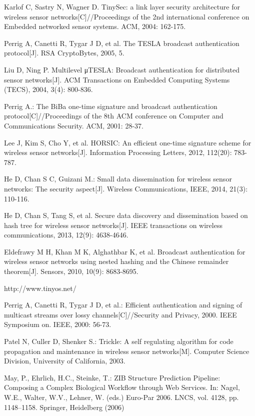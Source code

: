 \documentclass{sig-alternate-05-2015}
\begin{document}
\begin{thebibliography}{13}

 Karlof C, Sastry N, Wagner D. TinySec: a link layer security architecture for wireless sensor networks[C]//Proceedings of the 2nd international conference on Embedded networked sensor systems. ACM, 2004: 162-175.

 Perrig A, Canetti R, Tygar J D, et al. The TESLA broadcast authentication protocol[J]. RSA CryptoBytes, 2005, 5.

Liu D, Ning P. Multilevel μTESLA: Broadcast authentication for distributed sensor networks[J]. ACM Transactions on Embedded Computing Systems (TECS), 2004, 3(4): 800-836.

 Perrig A.: The BiBa one-time signature and broadcast authentication protocol[C]//Proceedings of the 8th ACM conference on Computer and Communications Security. ACM, 2001: 28-37.

 Lee J, Kim S, Cho Y, et al. HORSIC: An efficient one-time signature scheme for wireless sensor networks[J]. Information Processing Letters, 2012, 112(20): 783-787.

 He D, Chan S C, Guizani M.: Small data dissemination for wireless sensor networks: The security aspect[J]. Wireless Communications, IEEE, 2014, 21(3): 110-116.

 He D, Chan S, Tang S, et al. Secure data discovery and dissemination based on hash tree for wireless sensor networks[J]. IEEE transactions on wireless communications, 2013, 12(9): 4638-4646.

 Eldefrawy M H, Khan M K, Alghathbar K, et al. Broadcast authentication for wireless sensor networks using nested hashing and the Chinese remainder theorem[J]. Sensors, 2010, 10(9): 8683-8695.

 http://www.tinyos.net/

 Perrig A, Canetti R, Tygar J D, et al.: Efficient authentication and signing of multicast streams over lossy channels[C]//Security and Privacy, 2000. IEEE Symposium on. IEEE, 2000: 56-73.%

Patel N, Culler D, Shenker S.: Trickle: A self regulating algorithm for code propagation and maintenance in wireless sensor networks[M]. Computer Science Division, University of California, 2003.

 May, P., Ehrlich, H.C., Steinke, T.: ZIB Structure Prediction Pipeline:
Composing a Complex Biological Workflow through Web Services. In: Nagel,
W.E., Walter, W.V., Lehner, W. (eds.) Euro-Par 2006. LNCS, vol. 4128,
pp. 1148--1158. Springer, Heidelberg (2006)


\end{thebibliography}
\end{document}
